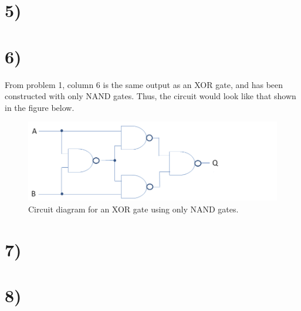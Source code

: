 \documentclass[a4paper,11pt]{article}
\begin{document}

\section*{5)}



\section*{6)}

From problem 1, column 6 is the same output as an XOR gate, and has been constructed with only NAND gates.  Thus, the circuit
would look like that shown in the figure below.

\begin{figure}[h]
\caption{Circuit diagram for an XOR gate using only NAND gates.}
\centering
\includegraphics[width=1\textwidth]{p6_circuit.png}
\end{figure}


\section*{7)}



\section*{8)}


\end{document}
